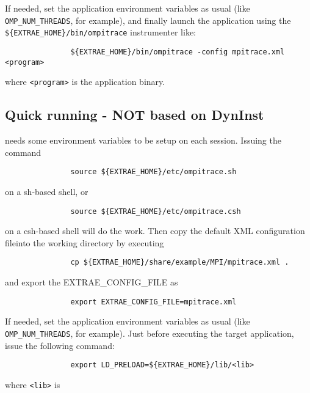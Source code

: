 If needed, set the application environment variables as usual (like {\tt OMP\_NUM\_THREADS}, for example), and finally launch the application using the {\tt \$\{EXTRAE\_HOME\}/bin/ompitrace} instrumenter like:

\begin{verbatim}
               ${EXTRAE_HOME}/bin/ompitrace -config mpitrace.xml <program>
\end{verbatim}

where {\tt <program>} is the application binary.

\subsection{Quick running \TRACE - NOT based on DynInst}\label{subsec:RunningTraceNOTDynInst}

\TRACE needs some environment variables to be setup on each session. Issuing the command 

\begin{verbatim}
               source ${EXTRAE_HOME}/etc/ompitrace.sh
\end{verbatim}

on a sh-based shell, or 

\begin{verbatim}
               source ${EXTRAE_HOME}/etc/ompitrace.csh
\end{verbatim}

on a csh-based shell will do the work. Then copy the default XML configuration file\footnotemark[1] into the working directory by executing

\begin{verbatim}
               cp ${EXTRAE_HOME}/share/example/MPI/mpitrace.xml .
\end{verbatim}

and export the {EXTRAE\_CONFIG\_FILE} as

\begin{verbatim}
               export EXTRAE_CONFIG_FILE=mpitrace.xml
\end{verbatim}

If needed, set the application environment variables as usual (like {\tt OMP\_NUM\_THREADS}, for example). Just before executing the target application, issue the following command:

\begin{verbatim}
               export LD_PRELOAD=${EXTRAE_HOME}/lib/<lib>
\end{verbatim}

where {\tt <lib>} is

